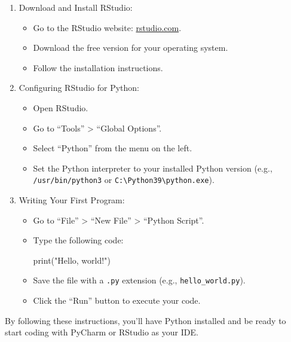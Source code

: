 \documentclass[
  letterpaper,
  DIV=11,
  numbers=noendperiod]{scrreprt}
\newenvironment{Shaded}{\begin{snugshade}}{\end{snugshade}}
\newcommand{\BuiltInTok}[1]{\textcolor[rgb]{0.00,0.23,0.31}{#1}}
\newcommand{\NormalTok}[1]{\textcolor[rgb]{0.00,0.23,0.31}{#1}}
\newcommand{\StringTok}[1]{\textcolor[rgb]{0.13,0.47,0.30}{#1}}
\providecommand{\tightlist}{%
  \setlength{\itemsep}{0pt}\setlength{\parskip}{0pt}}\usepackage{longtable,booktabs,array}
\begin{document}
\begin{enumerate}
\def\labelenumi{\arabic{enumi}.}
\tightlist
\item
  Download and Install RStudio:

  \begin{itemize}
  \tightlist
  \item
    Go to the RStudio website:
    \href{https://rstudio.com/products/rstudio/download/}{rstudio.com}.
  \item
    Download the free version for your operating system.
  \item
    Follow the installation instructions.
  \end{itemize}
\item
  Configuring RStudio for Python:

  \begin{itemize}
  \tightlist
  \item
    Open RStudio.
  \item
    Go to ``Tools'' \textgreater{} ``Global Options''.
  \item
    Select ``Python'' from the menu on the left.
  \item
    Set the Python interpreter to your installed Python version (e.g.,
    \texttt{/usr/bin/python3} or
    \texttt{C:\textbackslash{}Python39\textbackslash{}python.exe}).
  \end{itemize}
\item
  Writing Your First Program:

  \begin{itemize}
  \item
    Go to ``File'' \textgreater{} ``New File'' \textgreater{} ``Python
    Script''.
  \item
    Type the following code:

\begin{Shaded}
\begin{Highlighting}[]
\BuiltInTok{print}\NormalTok{(}\StringTok{"Hello, world!"}\NormalTok{)}
\end{Highlighting}
\end{Shaded}
  \item
    Save the file with a \texttt{.py} extension (e.g.,
    \texttt{hello\_world.py}).
  \item
    Click the ``Run'' button to execute your code.
  \end{itemize}
\end{enumerate}

By following these instructions, you'll have Python installed and be
ready to start coding with PyCharm or RStudio as your IDE.
\end{document}
